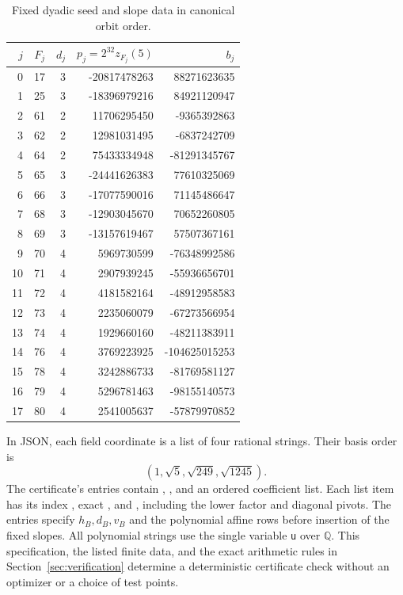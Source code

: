\documentclass[11pt]{article}
\newcommand{\Q}{\mathbb Q}
\begin{document}
\begin{table}[ht]
\centering\small
\begin{tabular}{r r r r r}
\toprule
$j$&$F_j$&$d_j$&$p_j=2^{32}z_{F_j}(5)$&$b_j$\\\midrule
0&17&3&-20817478263&88271623635\\
1&25&3&-18396979216&84921120947\\
2&61&2&11706295450&-9365392863\\
3&62&2&12981031495&-6837242709\\
4&64&2&75433334948&-81291345767\\
5&65&3&-24441626383&77610325069\\
6&66&3&-17077590016&71145486647\\
7&68&3&-12903045670&70652260805\\
8&69&3&-13157619467&57507367161\\
9&70&4&5969730599&-76348992586\\
10&71&4&2907939245&-55936656701\\
11&72&4&4181582164&-48912958583\\
12&73&4&2235060079&-67273566954\\
13&74&4&1929660160&-48211383911\\
14&76&4&3769223925&-104625015253\\
15&78&4&3242886733&-81769581127\\
16&79&4&5296781463&-98155140573\\
17&80&4&2541005637&-57879970852\\\bottomrule
\end{tabular}
\caption{Fixed dyadic seed and slope data in canonical orbit order.}\label{tab:free}
\end{table}

In JSON, each field coordinate is a list of four rational strings.
Their basis order is
\[ (1,\sqrt5,\sqrt{249},\sqrt{1245}). \]
The certificate's  entries contain
, , and an ordered coefficient list.
Each list item has its index , exact , and
, including the lower factor and diagonal pivots.
The  entries specify $h_B,d_B,v_B$
and the polynomial affine rows before insertion of the fixed slopes.
All polynomial strings use the single variable \texttt{u} over $\Q$.
This specification, the listed finite data, and the exact arithmetic
rules in Section~\ref{sec:verification} determine a deterministic
certificate check without an optimizer or a choice of test points.
\end{document}
